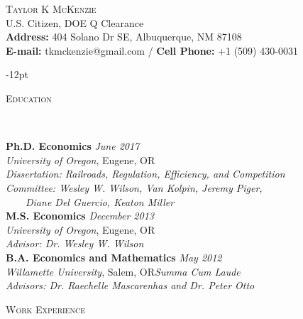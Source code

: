 \documentclass[11pt]{article}
\newenvironment{changemargin}[2]{%
  \begin{list}{}{%
    \setlength{\topsep}{0pt}%
    \setlength{\leftmargin}{#1}%
    \setlength{\rightmargin}{#2}%
    \setlength{\listparindent}{\parindent}%
    \setlength{\itemindent}{\parindent}%
    \setlength{\parsep}{\parskip}%
  }%
  \item[]}{\end{list}
}
\newcommand{\lineover}{
	\begin{changemargin}{-0.05in}{-0.05in}
		\vspace*{-8pt}
		\hrulefill \\
		\vspace*{-2pt}
	\end{changemargin}
}
\newcommand{\header}[1]{
	\begin{changemargin}{-0.5in}{-0.5in}
		\scshape{#1}\\
  	\lineover
	\end{changemargin}
}
\newcommand{\contact}[4]{
	\begin{changemargin}{-0.5in}{-0.5in}
		\begin{center}
			{\Large \scshape {#1}}\\ \smallskip
			{#2}\\ \smallskip 
			{#3}\\ \smallskip
			{#4}\smallskip
		\end{center}
	\end{changemargin}
}
\newenvironment{body} {
	\vspace*{-16pt}
	\begin{changemargin}{-0.25in}{-0.5in}
  }	
	{\end{changemargin}
}
\begin{document}



\contact{\vspace*{-5ex}Taylor K McKenzie}{U.S. Citizen, DOE Q Clearance\\ \textbf{Address:} 404 Solano Dr SE, Albuquerque, NM 87108}{\vspace*{-0.75ex}\textbf{E-mail:} tkmckenzie@gmail.com / \textbf{Cell Phone:} +1 (509) 430-0031}

\vspace{-12pt}
\header{Education}

\begin{body}
	\vspace{14pt}
	\textbf{Ph.D. Economics}{} \hfill \emph{June 2017}{} \\
	\emph{University of Oregon}, Eugene, OR{}\\
	\emph{Dissertation: Railroads, Regulation, Efficiency, and Competition}\\
	\emph{Committee: Wesley W. Wilson, Van Kolpin, Jeremy Piger,}\\
	\ \ \ \ \emph{Diane Del Guercio, Keaton Miller}\\
	\vspace*{0pt}
  \medskip
	\textbf{M.S. Economics}{} \hfill \emph{December 2013}{} \\
	\emph{University of Oregon}, Eugene, OR{}\\
	\emph{Advisor: Dr. Wesley W. Wilson} \\
	\vspace*{0pt}
  \medskip
  	\textbf{B.A. Economics and Mathematics}{} \hfill \emph{May 2012}{} \\
	\emph{Willamette University}, Salem, OR{}\hfill \emph{Summa Cum Laude}{}\\
	\emph{Advisors: Dr. Raechelle Mascarenhas and Dr. Peter Otto} {} \hfill\\
\end{body}
\smallskip
\header{Work Experience}
\end{document}

